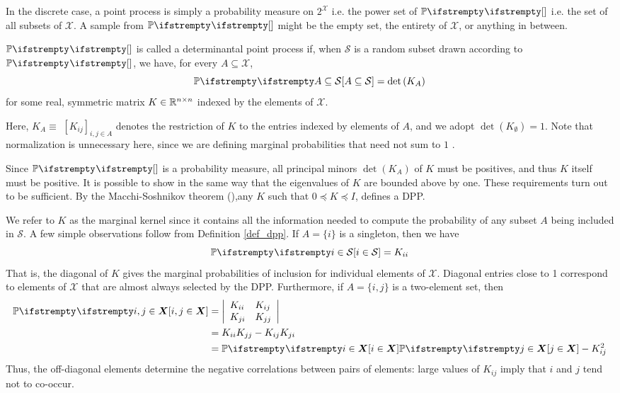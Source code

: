 In the discrete case, a point process is simply a probability measure on $2^{\mathcal X}$ i.e. the power set of $\PP{}{}$ i.e. the set of all subsets of $\mathcal{X}$. A sample from $\PP{}{}$ might be the empty set, the entirety of $\mathcal{X}$, or anything in between. 
\begin{definition}
    \label{def_dpp}
    $\PP{}{}$ is called a determinantal point process if, when $\mathcal{S}$ is a random subset drawn according to $\PP{}{}$, we have, for every $A \subseteq \mathcal{X}$,
    \begin{equation}
        \PP{}{A \subseteq \mathcal{S}}=\operatorname{det}\left(K_A\right)
    \end{equation}
    for some real, symmetric matrix $K \in \mathbb{R}^{n \times n}$ indexed by the elements of $\mathcal{X}$.
\end{definition}
Here, $K_A \equiv$ $\left[K_{i j}\right]_{i, j \in A}$ denotes the restriction of $K$ to the entries indexed by elements of $A$, and we adopt $\operatorname{det}\left(K_\emptyset\right)=1$. Note that normalization is unnecessary here, since we are defining marginal probabilities that need not sum to $1$ .

Since $\PP{}{}$ is a probability measure, all principal minors $\operatorname{det}\left(K_A\right)$ of $K$ must be positives, and thus $K$ itself must be positive. It is possible to show in the same way that the eigenvalues of $K$ are bounded above by one. These requirements turn out to be sufficient. By the Macchi-Soshnikov theorem (\cite{macchi1975dpp}),any $K$ such that $0 \preceq K \preceq I$, defines a DPP.

We refer to $K$ as the marginal kernel since it contains all the information needed to compute the probability of any subset $A$ being included in $\mathcal{S}$. A few simple observations follow from Definition \ref{def_dpp}. If $A=\{i\}$ is a singleton, then we have
\begin{equation*}
	\PP{}{i \in \mathcal{S}}=K_{i i}
\end{equation*}
That is, the diagonal of $K$ gives the marginal probabilities of inclusion for individual elements of $\mathcal{X}$. Diagonal entries close to 1 correspond to elements of $\mathcal{X}$ that are almost always selected by the DPP. Furthermore, if $A=\{i, j\}$ is a two-element set, then
\begin{equation}
    \label{eqn_paircorrel}
	\begin{aligned}
        \PP{}{i, j \in \boldsymbol{X}} &=\left|\begin{array}{ll}
	K_{i i} & K_{i j} \\
	K_{j i} & K_{j j}
	\end{array}\right| \\
	&=K_{i i} K_{j j}-K_{i j} K_{j i} \\
	&=\PP{}{i \in \boldsymbol{X}} \PP{}{j \in \boldsymbol{X}}-K_{i j}^2
	\end{aligned}
\end{equation}
Thus, the off-diagonal elements determine the negative correlations between pairs of elements: large values of $K_{i j}$ imply that $i$ and $j$ tend not to co-occur.

